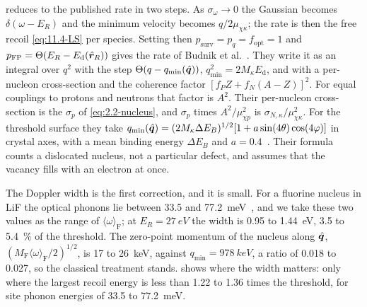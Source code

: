  reduces to the published rate in two steps. As $\sigma_\omega \to 0$ the Gaussian becomes $\delta(\omega - E_R)$ and the minimum velocity becomes $q/2\mu_{\chi\kappa}$; the rate is then the free recoil \cref{eq:11.4-LS} per species. Setting then $p_{\mathrm{surv}} = p_q = f_{\mathrm{opt}} = 1$ and $p_{\mathrm{FP}} = \Theta(E_R - E_{\mathrm{d}}(\hat{\bm{r}}_R))$ gives the rate of Budnik et al.~\cite[Eqs.~(1), (5), (7)]{budnik2018direct}. They write it as an integral over $q^2$ with the step $\Theta(q - q_{\min}(\hat{\bm{q}}))$, $q_{\min}^2 = 2M_\kappa E_{\mathrm{d}}$, and with a per-nucleon cross-section and the coherence factor $[f_PZ + f_N(A - Z)]^2$. For equal couplings to protons and neutrons that factor is $A^2$. Their per-nucleon cross-section is the $\sigma_p$ of \cref{eq:2.2-nucleus}, and $\sigma_p$ times $A^2/\mu_{\chi p}^2$ is $\sigma_{N,\kappa}/\mu_{\chi\kappa}^2$. For the threshold surface they take $q_{\min}(\hat{\bm{q}}) = (2M_\kappa\Delta E_B)^{1/2}[1 + a\sin(4\theta)\cos(4\varphi)]$ in crystal axes, with a mean binding energy $\Delta E_B$ and $a = 0.4$~\cite[Eq.~(2) and Table~I]{budnik2018direct}. Their formula counts a dislocated nucleus, not a particular defect, and assumes that the vacancy fills with an electron at once.

The Doppler width is the first correction, and it is small. For a fluorine nucleus in LiF the optical phonons lie between 33.5 and \SI{77.2}{meV}~\cite[Table~I]{griffin2020multichannel}, and we take these two values as the range of $\langle\omega\rangle_{\mathrm{F}}$; at $E_R = \SI{27}{eV}$ the width is 0.95 to \SI{1.44}{eV}, 3.5 to \SI{5.4}{\percent} of the threshold. The zero-point momentum of the nucleus along $\hat{\bm{q}}$, $(M_{\mathrm{F}}\langle\omega\rangle_{\mathrm{F}}/2)^{1/2}$, is 17 to \SI{26}{keV}, against $q_{\min} = \SI{978}{keV}$, a ratio of 0.018 to 0.027, so the classical treatment stands.  shows where the width matters: only where the largest recoil energy is less than 1.22 to 1.36 times the threshold, for site phonon energies of 33.5 to \SI{77.2}{meV}.

